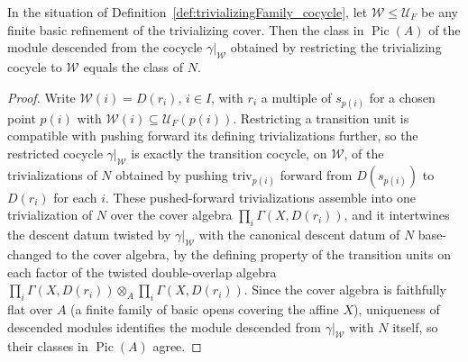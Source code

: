 \begin{theorem}
  \label{thm:trivializingFamily_pic_cocycle}
  \leanok
  In the situation of Definition~\ref{def:trivializingFamily_cocycle}, let \(\mathcal W \le
  \mathcal U_F\) be any finite basic refinement of the trivializing cover. Then the class in
  \(\operatorname{Pic}(A)\) of the module descended from the cocycle \(\gamma|_{\mathcal W}\)
  obtained by restricting the trivializing cocycle to \(\mathcal W\) equals the class of \(N\).
\end{theorem}
\begin{proof}
  \leanok
  Write \(\mathcal W(i) = D(r_i)\), \(i \in I\), with \(r_i\) a multiple of \(s_{p(i)}\) for a
  chosen point \(p(i)\) with \(\mathcal W(i) \subseteq \mathcal U_F(p(i))\). Restricting a
  transition unit is compatible with pushing forward its defining trivializations further, so
  the restricted cocycle \(\gamma|_{\mathcal W}\) is exactly the transition cocycle, on
  \(\mathcal W\), of the trivializations of \(N\) obtained by pushing \(\mathrm{triv}_{p(i)}\)
  forward from \(D(s_{p(i)})\) to \(D(r_i)\) for each \(i\). These pushed-forward
  trivializations assemble into one trivialization of \(N\) over the cover algebra
  \(\prod_i \Gamma(X,D(r_i))\), and it intertwines the descent datum twisted by
  \(\gamma|_{\mathcal W}\) with the canonical descent datum of \(N\) base-changed to the cover
  algebra, by the defining property of the transition units on each factor of the twisted
  double-overlap algebra \(\prod_i \Gamma(X,D(r_i)) \otimes_A \prod_i \Gamma(X,D(r_i))\). Since
  the cover algebra is faithfully flat over \(A\) (a finite family of basic opens covering the
  affine \(X\)), uniqueness of descended modules identifies the module descended from
  \(\gamma|_{\mathcal W}\) with \(N\) itself, so their classes in \(\operatorname{Pic}(A)\)
  agree.
\end{proof}

